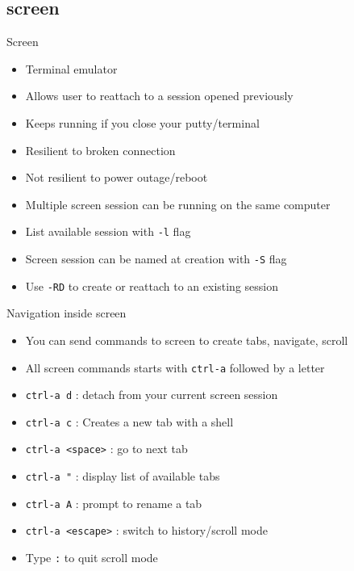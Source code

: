 \subsection{screen}

\begin{frame}{Screen}
\begin{itemize}
\item Terminal emulator
\pause \item Allows user to reattach to a session opened previously
\pause \item Keeps running if you close your putty/terminal
\pause \item Resilient to broken connection
\pause \item Not resilient to power outage/reboot
\pause \item Multiple screen session can be running on the same computer
\pause \item List available session with \texttt{-l} flag
\pause \item Screen session can be named at creation with \texttt{-S} flag
\pause \item Use \texttt{-RD} to create or reattach to an existing session
\end{itemize}
\end{frame}
%
%
%
%


\begin{frame}{Navigation inside screen}
\begin{itemize}
  \item You can send commands to screen to create tabs, navigate, scroll
  \pause \item All screen commands starts with \texttt{ctrl-a} followed by a letter
  \pause \item \texttt{ctrl-a d} : detach from your current screen session
  \pause \item \texttt{ctrl-a c} : Creates a new tab with a shell
  \pause \item \texttt{ctrl-a <space>} : go to next tab
  \pause \item \texttt{ctrl-a "} : display list of available tabs
  \pause \item \texttt{ctrl-a A} : prompt to rename a tab
  \pause \item \texttt{ctrl-a <escape>} : switch to history/scroll mode
  \pause \item Type \texttt{:} to quit scroll mode
\end{itemize}
\end{frame}

